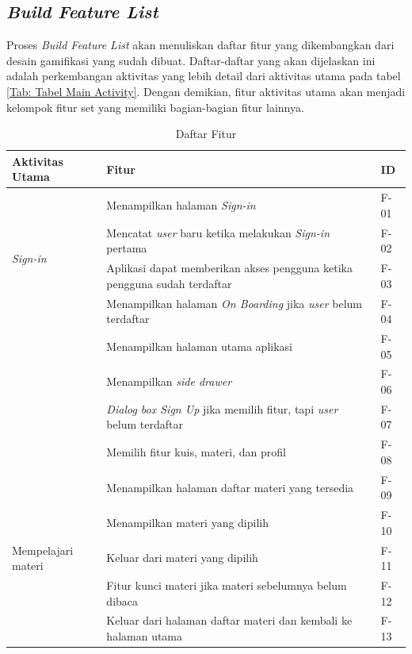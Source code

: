 \subsection{\textit{Build Feature List}}
Proses \textit{Build Feature List} akan menuliskan daftar fitur yang dikembangkan dari desain gamifikasi yang sudah dibuat.
Daftar-daftar yang akan dijelaskan ini adalah perkembangan aktivitas yang lebih detail dari aktivitas utama pada tabel \ref*{Tab: Tabel Main Activity}.
Dengan demikian, fitur aktivitas utama akan menjadi kelompok fitur set yang memiliki bagian-bagian fitur lainnya.
\begin{table}[H]
	\centering
	\caption{Daftar Fitur}
	\begin{tabular}{|m{3cm}|p{}|m{1cm}|}
		\hline
		\centering\textbf{Aktivitas Utama} & \centering\textbf{Fitur} & \multicolumn{1}{m{1cm}|}{\centering \textbf{ID}} \\
		\hline
		\multirow{4}{2.5cm}{\textit{Sign-in}} &Menampilkan halaman \textit{Sign-in} & F-01 \\
		\cline{2-3}
		 &Mencatat \textit{user} baru ketika melakukan \textit{Sign-in} pertama & F-02 \\
		\cline{2-3}
		 &Aplikasi dapat memberikan akses pengguna ketika pengguna sudah terdaftar& F-03 \\
		\hline
		\multirow{5}{2.5cm}{Melihat \textit{dashboard} halaman utama} &Menampilkan halaman \textit{On Boarding} jika \textit{user} belum terdaftar & F-04 \\
		\cline{2-3}
		&Menampilkan halaman utama aplikasi& F-05 \\
		\cline{2-3}
		&Menampilkan \textit{side drawer}& F-06 \\
		\cline{2-3}
		&\textit{Dialog box Sign Up} jika memilih fitur, tapi \textit{user} belum terdaftar& F-07 \\
		\cline{2-3}
		&Memilih fitur kuis, materi, dan profil& F-08 \\
		\hline
		\multirow{6}{2.5cm}{Mempelajari materi} &Menampilkan halaman daftar materi yang tersedia& F-09 \\
		\cline{2-3}
		&Menampilkan materi yang dipilih & F-10 \\
		\cline{2-3}
		&Keluar dari materi yang dipilih& F-11 \\
		\cline{2-3}
		&Fitur kunci materi jika materi sebelumnya belum dibaca& F-12 \\
		\cline{2-3}
		&Keluar dari halaman daftar materi dan kembali ke halaman utama& F-13 \\
		\hline

	\end{tabular}
\end{table}

